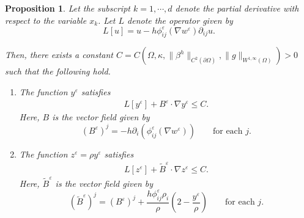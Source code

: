 \documentclass[11pt]{article}
\numberwithin{equation}{section}
\newtheorem{proposition}[theorem]{Proposition}
\def\leq{\leqslant}
\begin{document}
\begin{proposition}\label{prop:equation-v}
Let the subscript $k=1,\cdots,d$ denote the partial derivative with respect to the variable $x_k$. Let $L$ denote the operator given by
\[
L[u] = u - h \phi^{\varepsilon}_{ij}(\nabla w^{\varepsilon}) \partial_{ij} u.
\]

Then, there exists a constant $C=C(\Omega,\kappa,\|\beta^h\|_{C^2(\partial\Omega)},\|g\|_{W^{1,\infty}(\Omega)})>0$ such that the following hold.

\begin{enumerate}[label=(\roman*)]
\item The function $y^{\varepsilon}$ satisfies
\begin{align*}
L[y^{\varepsilon}] + B^{\varepsilon}\cdot\nabla y^{\varepsilon}\leq C.
\end{align*}
Here, $B$ is the vector field given by
\[
(B^{\varepsilon})^j = -h \partial_i (\phi^{\varepsilon}_{ij}(\nabla w^{\varepsilon}))\qquad\text{for each }j.
\]

\item The function $z^{\varepsilon}=\rho y^{\varepsilon}$ satisfies
\begin{align*}
L[z^{\varepsilon}] + \widetilde{B}^{\varepsilon}\cdot\nabla z^{\varepsilon}\leq C.
\end{align*}
Here, $\widetilde{B}^{\varepsilon}$ is the vector field given by
\[
(\widetilde{B}^{\varepsilon})^j = (B^{\varepsilon})^j + \frac{h\phi^{\varepsilon}_{ij}\rho_i}{\rho}\left(2-\frac{y^{\varepsilon}}{\rho}\right)\qquad\text{for each }j.
\]
\end{enumerate}


\end{proposition}


\end{document}
